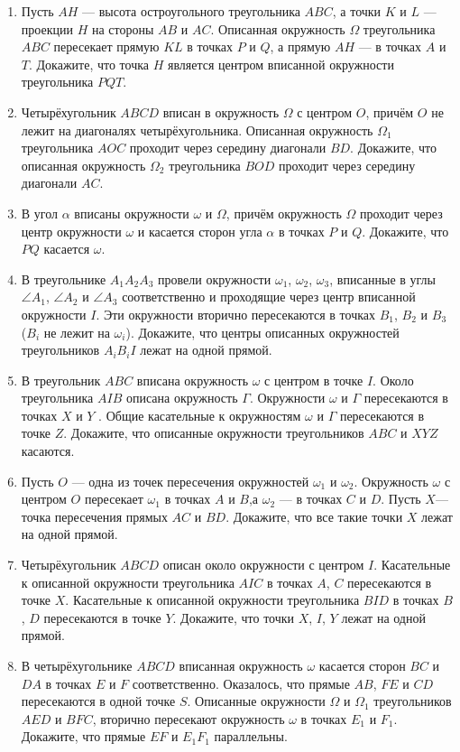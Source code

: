 \documentclass{article}
\begin{document}
\begin{enumerate}[label*=\protect\fbox{\arabic{enumi}}]
\item Пусть $AH$ — высота остроугольного треугольника $ABC$, а точки $K$ и $L$ — проекции $H$ на стороны $AB$ и $AC$. Описанная окружность $\Omega$ треугольника $ABC$ пересекает прямую $KL$ в точках $P$ и $Q$, а прямую $AH$ — в точках $A$ и $T$. Докажите, что точка $H$ является центром вписанной окружности треугольника $PQT$.

\item Четырёхугольник $ABCD$ вписан в окружность $\Omega$ с центром $O$, причём $O$ не лежит на диагоналях четырёхугольника. Описанная окружность $\Omega_1$ треугольника $AOC$ проходит через середину диагонали $BD$. Докажите, что описанная окружность $\Omega_2$ треугольника $BOD$ проходит через середину диагонали $AC$.

\item В угол $\alpha$ вписаны окружности $\omega$ и $\Omega$, причём окружность $\Omega$ проходит через центр окружности $\omega$ и касается сторон угла $\alpha$ в точках $P$ и $Q$. Докажите, что $PQ$ касается $\omega$.

\item В треугольнике $A_1A_2A_3$ провели окружности $\omega_1$, $\omega_2$, $\omega_3$, вписанные в углы $\angle A_1$, $\angle A_2$ и $\angle A_3$ соответственно и проходящие через центр вписанной окружности $I$. Эти окружности вторично пересекаются в точках $B_1$, $B_2$ и $B_3$ ($B_i$ не лежит на $\omega_i$). Докажите, что центры описанных окружностей треугольников $A_iB_iI$ лежат на одной прямой.

\item В треугольник $ABC$ вписана окружность $\omega$ с центром в точке $I$. Около треугольника $AIB$ описана окружность $\Gamma$. Окружности $\omega$ и $\Gamma$ пересекаются в точках $X$ и $Y$ . Общие касательные к окружностям $\omega$ и $\Gamma$ пересекаются в точке $Z$. Докажите, что описанные окружности треугольников $ABC$ и $XYZ$ касаются.

\item Пусть $O$ — одна из точек пересечения окружностей $\omega_1$ и $\omega_2$. Окружность $\omega$ с центром $O$ пересекает $\omega_1$ в точках $A$ и $B$,а $\omega_2$ — в точках $C$ и $D$. Пусть $X$— точка пересечения прямых $AC$ и $BD$. Докажите, что все такие точки $X$ лежат на одной прямой.

\item Четырёхугольник $ABCD$ описан около окружности с центром $I$. Касательные к описанной окружности треугольника $AIC$ в точках $A$, $C$ пересекаются в точке $X$. Касательные к описанной окружности треугольника $BID$ в точках $B$, $D$ пересекаются в точке $Y$. Докажите, что точки $X$, $I$, $Y$ лежат на одной прямой.

\item В четырёхугольнике $ABCD$ вписанная окружность $\omega$ касается сторон $BC$ и $DA$ в точках $E$ и $F$ соответственно. Оказалось, что прямые $AB$, $FE$ и $CD$ пересекаются в одной точке $S$. Описанные окружности $\Omega$ и $\Omega_1$ треугольников $AED$ и $BFC$, вторично пересекают окружность $\omega$ в точках $E_1$ и $F_1$. Докажите, что прямые $EF$ и $E_1F_1$ параллельны.

\end{enumerate}
\end{document}
